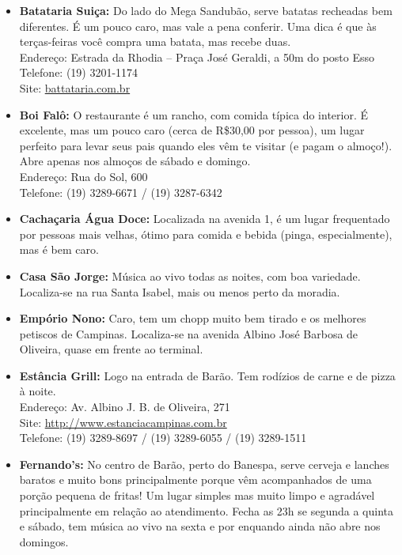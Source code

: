 \begin{itemize}
    \item   \textbf{Batataria Suiça:} Do lado do Mega Sandubão, serve batatas
        recheadas bem diferentes. É um pouco caro, mas vale a pena conferir. Uma
        dica é que às terças-feiras você compra uma batata, mas recebe duas.
        \\Endereço: Estrada da Rhodia -- Praça José Geraldi, a 50m do posto Esso
        \\Telefone: (19) 3201-1174
        \\Site: \url{battataria.com.br}

    \item   \textbf{Boi Falô:} O restaurante é um rancho, com comida típica do
        interior. É excelente, mas um pouco caro (cerca de R\$30,00 por pessoa),
        um lugar perfeito para levar seus pais quando eles vêm te visitar (e
        pagam o almoço!). Abre apenas nos almoços de sábado e domingo.
        \\Endereço: Rua do Sol, 600
        \\Telefone: (19) 3289-6671 / (19) 3287-6342%

    \item   \textbf{Cachaçaria Água Doce:} Localizada na avenida 1, é um lugar
        frequentado por pessoas mais velhas, ótimo para comida e bebida (pinga,
        especialmente), mas é bem caro.

    \item   \textbf{Casa São Jorge:} Música ao vivo todas as noites, com boa
        variedade. Localiza-se na rua Santa Isabel, mais ou menos perto da
        moradia.

    \item   \textbf{Empório Nono:} Caro, tem um chopp muito bem tirado e os
        melhores petiscos de Campinas. Localiza-se na avenida Albino José
        Barbosa de Oliveira, quase em frente ao terminal.

    \item   \textbf{Estância Grill:} Logo na entrada de Barão. Tem rodízios de
        carne e de pizza à noite.
        \\Endereço: Av. Albino J. B. de Oliveira, 271
        \\Site: \url{http://www.estanciacampinas.com.br}
        \\Telefone: (19) 3289-8697 / (19) 3289-6055 / (19) 3289-1511

    \item   \textbf{Fernando's:} No centro de Barão, perto do Banespa, serve
        cerveja e lanches baratos e muito bons principalmente porque vêm
        acompanhados de uma porção pequena de fritas! Um lugar simples mas muito
        limpo e agradável principalmente em relação ao atendimento. Fecha as 23h
        se segunda a quinta e sábado, tem música ao vivo na sexta e por enquando
        ainda não abre nos domingos.


\end{itemize}
